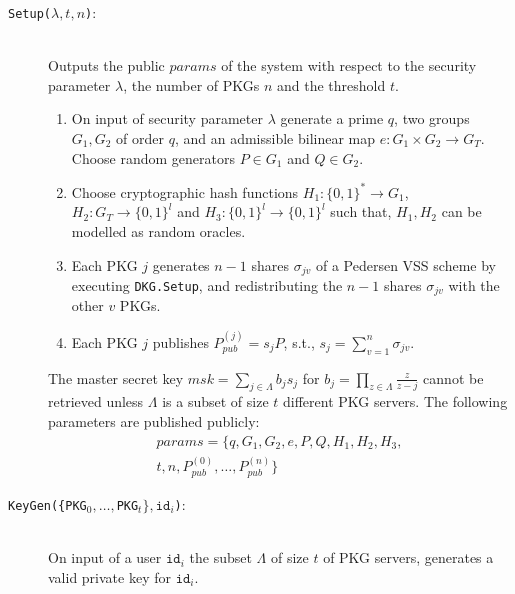 \documentclass[journal]{IEEEtran}
\newcommand{\id}[1]{\ensuremath{\mathtt{id}_{#1}}}
\begin{document}
\begin{description}
    \item[\texttt{Setup($\lambda, t, n$)}:]~\\ Outputs the public $params$ of the system with respect to the security parameter $\lambda$, the number of PKGs $n$ and the threshold $t$.
    \begin{enumerate}
        \item On input of security parameter $\lambda$ generate a prime $q$, two groups $G_1, G_2$ of order $q$, and an admissible bilinear map $e: G_1 \times G_2 \rightarrow G_T$. Choose random generators $P \in G_1$ and $Q \in G_2$. 
    
        \item Choose cryptographic hash functions $H_1: \{ 0,1 \}^{*} \rightarrow G_1$, ${H_2: G_T \rightarrow \{ 0,1 \}^{l}}$ and $H_3: \{ 0, 1 \}^{l} \rightarrow \{ 0,1 \}^{l}$ such that, $H_1, H_2$ can be modelled as random oracles.
        
        \item Each PKG $j$ generates $n-1$ shares $\sigma_{jv}$ of a Pedersen VSS scheme by executing \texttt{DKG.Setup}, and redistributing the $n-1$ shares $\sigma_{jv}$ with the other $v$ PKGs.

        \item Each PKG $j$ publishes $P_{pub}^{(j)} = s_j P$, s.t., $s_j=\sum_{v=1}^n \sigma_{jv}$.
    \end{enumerate}
    
    The master secret key $msk = \sum_{j \in \Lambda} b_j s_j$ for $b_j = \prod_{z \in \Lambda} \frac{z}{z-j}$ cannot be retrieved unless $\Lambda$ is a subset of size $t$ different PKG servers. The following parameters are published publicly:
    \begin{equation*}
    \begin{split}
    params = \{ q, G_1, G_2, e, P, Q, H_1, H_2, H_3, \\ t, n, P_{pub}^{(0)}, \ldots, P_{pub}^{(n)} \}
    \end{split}
    \end{equation*}
    
    \bigskip

    \item[\texttt{KeyGen(\{PKG$_0,\ldots,$PKG$_t\}, \id{i}$)}:]~\\ On input of a user $\id{i}$ the subset $\Lambda$ of size $t$ of PKG servers, generates a valid private key for \id{i}. 
    

\end{description}
\end{document}
